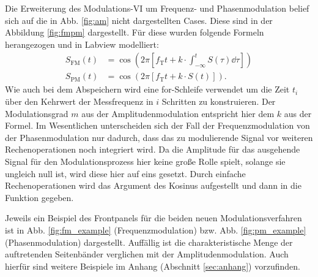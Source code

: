 	Die Erweiterung des Modulations-VI um Frequenz- und Phasenmodulation belief sich auf die in Abb. \ref{fig:am} nicht dargestellten Cases.
	Diese sind in der Abbildung \ref{fig:fmpm} dargestellt.
	Für diese wurden folgende Formeln herangezogen und in Labview modelliert:
	\begin{align}
		\label{eq:FM} S_\text{FM}(t) &= \cos{(2\pi[f_\text{T}t + k \cdot \int_{-\infty}^{t}{S(\tau)\dd{\tau}}])} \\
		\label{eq:PM} S_\text{PM}(t) &= \cos{(2\pi[f_\text{T}t + k \cdot S(t)])}.
	\end{align} 
	Wie auch bei dem Abspeichern wird eine for-Schleife verwendet um die Zeit $t_i$ über den Kehrwert der Messfrequenz in $i$ Schritten zu konstruieren.
	Der Modulationsgrad $m$ aus der Amplitudenmodulation entspricht hier dem $k$ aus der Formel.
	Im Wesentlichen unterscheiden sich der Fall der Frequenzmodulation von der Phasenmodulation nur dadurch, dass das zu modulierende Signal vor weiteren Rechenoperationen noch integriert wird.
	Da die Amplitude für das ausgehende Signal für den Modulationsprozess hier keine große Rolle spielt, solange sie ungleich null ist, wird diese hier auf eins gesetzt.
	Durch einfache Rechenoperationen wird das Argument des Kosinus aufgestellt und dann in die Funktion gegeben.
		
	Jeweils ein Beispiel des Frontpanels für die beiden neuen Modulationsverfahren ist in Abb. \ref{fig:fm_example} (Frequenzmodulation) bzw. Abb. \ref{fig:pm_example} (Phasenmodulation) dargestellt.
	Auffällig ist die charakteristische Menge der auftretenden Seitenbänder verglichen mit der Amplitudenmodulation.
	Auch hierfür sind weitere Beispiele im Anhang (Abschnitt \ref{sec:anhang}) vorzufinden.
	
